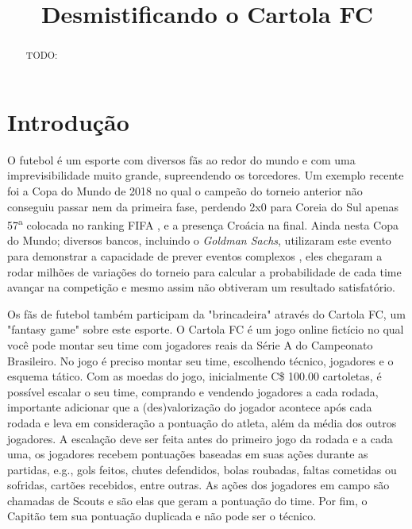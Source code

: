 \documentclass[conference]{IEEEtran}
\newcommand{\tit}[1]{{\textit{#1}}}
\newcommand{\ts}{\textsuperscript}
\begin{document}
\title{Desmistificando o Cartola FC}

\author
{
  \and
  \and
  \and
}

\maketitle

\begin{abstract}

TODO:

\end{abstract}

\section{Introdução}

O futebol é um esporte com diversos  fãs ao redor do mundo e com uma
imprevisibilidade muito grande, supreendendo os torcedores. Um exemplo
recente foi  a Copa  do Mundo de  2018 no qual  o campeão  do torneio
anterior não conseguiu passar nem da primeira fase, perdendo 2x0 para
Coreia do Sul apenas 57\ts{a}  colocada no ranking FIFA \cite{fifa}, e
a presença  Croácia na  final. Ainda nesta  Copa do  Mundo; diversos
bancos, incluindo  o \tit{Goldman Sachs}, utilizaram  este evento para
demonstrar a capacidade de  prever eventos complexos \cite{news}, eles
chegaram a  rodar milhões de  variações do torneio para  calcular a
probabilidade de cada time avançar na competição e mesmo assim não
obtiveram um resultado satisfatório.

Os fãs  de futebol  também participam  da "brincadeira"  através do
Cartola FC, um  "fantasy game" sobre este esporte. O  Cartola FC é um
jogo online fictício no qual você pode montar seu time com jogadores
reais da Série A do Campeonato  Brasileiro. No jogo é preciso montar
seu time, escolhendo  técnico, jogadores e o esquema  tático. Com as
moedas  do  jogo, inicialmente  C\$  100.00  cartoletas, é  possível
escalar  o seu  time, comprando  e vendendo  jogadores a  cada rodada,
importante  adicionar que  a  (des)valorização  do jogador  acontece
após cada  rodada e leva  em consideração a pontuação  do atleta,
além da  média dos  outros jogadores. A  escalação deve  ser feita
antes do  primeiro jogo da rodada  e a cada uma,  os jogadores recebem
pontuações  baseadas  em suas  ações  durante  as partidas,  e.g.,
gols feitos,  chutes defendidos,  bolas roubadas, faltas  cometidas ou
sofridas, cartões  recebidos, entre outras. As  ações dos jogadores
em campo são  chamadas de Scouts e são elas  que geram a pontuação
do time. Por fim, o Capitão tem sua pontuação duplicada e não pode
ser o técnico.
\end{document}
